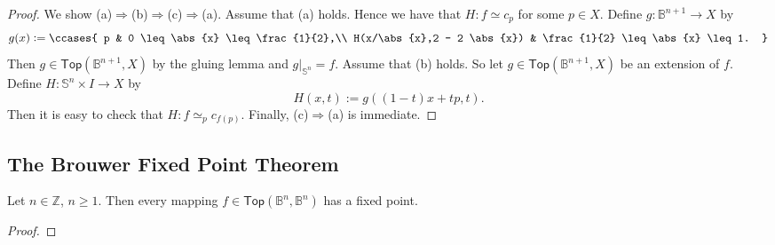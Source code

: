 \begin{proof}
	We show (a)$\Rightarrow$(b)$\Rightarrow$(c)$\Rightarrow$(a). Assume that (a) holds. Hence we have that $H : f \simeq c_p$ for some $p \in X$. Define $g : \mathbb{B}^{n+1} \to X$ by
	\begin{equation*}
		g(x) := \ccases{
			p & 0 \leq \abs{x} \leq \frac{1}{2},\\
			H(x/\abs{x},2 - 2 \abs{x}) & \frac{1}{2} \leq \abs{x} \leq 1.
		}
	\end{equation*}
	Then $g \in \mathsf{Top}(\mathbb{B}^{n+1},X)$ by the gluing lemma and $g\vert_{\mathbb{S}^n} = f$. Assume that (b) holds. So let $g \in \mathsf{Top}(\mathbb{B}^{n+1},X)$ be an extension of $f$. Define $H : \mathbb{S}^n \times I \to X$ by
	\begin{equation*}
		H(x,t) := g((1 - t)x + tp,t).
	\end{equation*}
	Then it is easy to check that $H : f \simeq_p c_{f(p)}$. Finally, (c)$\Rightarrow$(a) is immediate.
\end{proof}

\subsection*{The Brouwer Fixed Point Theorem}
\begin{theorem}
	Let $n \in \mathbb{Z}$, $n \geq 1$. Then every mapping $f \in \mathsf{Top}(\mathbb{B}^n,\mathbb{B}^n)$ has a fixed point.	
	\label{thm:brouwer_fixed_point}
\end{theorem}

\begin{proof}
	
\end{proof}
